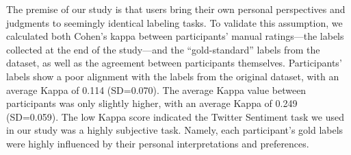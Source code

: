 The premise of our study is that users bring their own personal perspectives and judgments to seemingly identical labeling tasks. 
To validate this assumption, we calculated both Cohen's kappa
between participants' manual ratings---the labels collected at the end of the study---and the ``gold-standard'' labels from the dataset, as well as the agreement between participants themselves.
Participants' labels show a poor alignment with the labels from the original dataset, with an average Kappa of 0.114 (SD=0.070). 
The average Kappa value between participants was only slightly higher, with an average Kappa of 0.249 (SD=0.059).
The low Kappa score indicated the Twitter Sentiment task we used in our study was a highly subjective task. 
Namely, each participant's gold labels were highly influenced by their personal interpretations and preferences.


